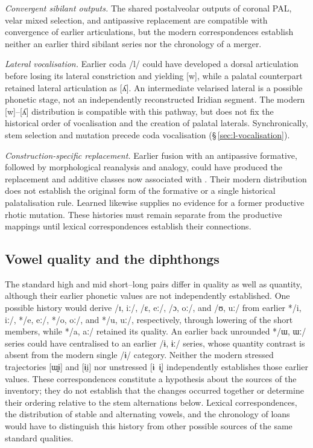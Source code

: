 \noindent\textit{Convergent sibilant outputs.}\quad
The shared postalveolar outputs of coronal PAL, velar mixed selection, and antipassive
replacement are compatible with convergence of earlier articulations, but
the modern correspondences establish neither an earlier third sibilant
series nor the chronology of a merger.

\noindent\textit{Lateral vocalisation.}\quad
Earlier coda /l/ could have developed a dorsal articulation before losing
its lateral constriction and yielding [w], while a palatal counterpart
retained lateral articulation as [ʎ]. An intermediate velarised lateral is
a possible phonetic stage, not an independently reconstructed Iridian
segment. The modern [w]--[ʎ] distribution is compatible with this pathway,
but does not fix the historical order of vocalisation and the creation of
palatal laterals. Synchronically, stem selection and mutation precede
coda vocalisation (§\,\ref{sec:l-vocalisation}).

\noindent\textit{Construction-specific replacement.}\quad
Earlier fusion with an antipassive formative, followed by morphological
reanalysis and analogy, could have produced the replacement and additive
classes now associated with . Their modern distribution does
not establish the original form of the formative or a single historical
palatalisation rule. Learned  likewise supplies no evidence for
a former productive rhotic mutation. These histories must remain separate
from the productive mappings until lexical correspondences establish
their connections.

\subsection{Vowel quality and the diphthongs}

The standard high and mid short--long pairs differ in quality as well as quantity, although
their earlier phonetic values are not independently established. One possible
history would derive /ɪ, iː/, /ɛ, eː/, /ɔ, oː/, and /ʊ, uː/ from earlier
*/i, iː/, */e, eː/, */o, oː/, and */u, uː/, respectively, through lowering
of the short members, while */a, aː/ retained its quality. An earlier back
unrounded */ɯ, ɯː/ series could have centralised to an earlier /ɨ, ɨː/
series, whose quantity contrast is absent from the modern single /ɨ/
category. Neither the modern stressed trajectories [ɯ̯ɨ] and [ɨi̯] nor
unstressed [ɨ~ɨ̞] independently establishes those earlier values.
These correspondences
constitute a hypothesis about the sources of the inventory; they do not
establish that the changes occurred together or determine their ordering
relative to the stem alternations below. Lexical correspondences, the
distribution of stable and alternating vowels, and the chronology of loans
would have to distinguish this history from other possible sources of the
same standard qualities.

